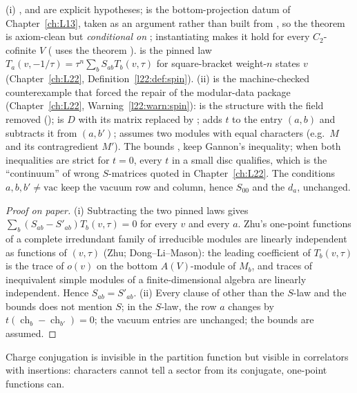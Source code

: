 \begin{dictionary}
(i) ,  and  are explicit hypotheses;  is the bottom-projection datum of
Chapter~\ref{ch:L13}, taken as an argument rather than built from , so the theorem is axiom-clean but
\emph{conditional on} ; instantiating  makes it hold for every
$C_2$-cofinite $V$ ( uses the theorem ).  is the pinned law $T_a(v,-1/\tau)=\tau^n\sum_b
S_{ab}T_b(v,\tau)$ for square-bracket weight-$n$ states $v$ (Chapter~\ref{ch:L22}, Definition~\ref{l22:def:spin}).
(ii) is the machine-checked counterexample that forced the repair of the modular-data package (Chapter~\ref{ch:L22},
Warning~\ref{l22:warn:spin}):  is the structure  with the field
 removed ();  is $D$ with its matrix replaced by
;  adds $t$ to the entry $(a,b)$ and subtracts it from $(a,b')$;  assumes
two modules with equal characters (e.g.\ $M$ and its contragredient $M'$). The bounds ,  keep
Gannon's inequality; when both inequalities are strict for $t=0$, every $t$ in a small disc qualifies, which is the
``continuum'' of wrong $S$-matrices quoted in Chapter~\ref{ch:L22}. The conditions $a,b,b'\ne\mathrm{vac}$ keep the
vacuum row and column, hence $S_{00}$ and the $d_a$, unchanged.
\end{dictionary}

\begin{proof}[Proof on paper]
(i) Subtracting the two pinned laws gives $\sum_b(S_{ab}-S'_{ab})T_b(v,\tau)=0$ for every $v$ and every $a$. Zhu's
one-point functions of a complete irredundant family of irreducible modules are linearly independent as functions of
$(v,\tau)$ (Zhu; Dong--Li--Mason): the leading coefficient of $T_b(v,\tau)$ is the trace of $o(v)$ on the bottom
$A(V)$-module of $M_b$, and traces of inequivalent simple modules of a finite-dimensional algebra are linearly
independent. Hence $S_{ab}=S'_{ab}$. (ii) Every clause of  other than the $S$-law and the bounds
does not mention $S$; in the $S$-law, the row $a$ changes by $t(\operatorname{ch}_b-\operatorname{ch}_{b'})=0$; the vacuum
entries are unchanged; the bounds are assumed.
\end{proof}

\begin{physics}
Charge conjugation is invisible in the partition function but visible in correlators with insertions: characters
cannot tell a sector from its conjugate, one-point functions can.
\end{physics}

